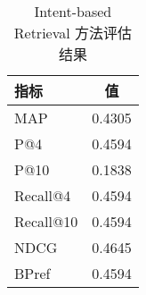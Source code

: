 \begin{table}[h]
\centering
\caption{Intent-based Retrieval 方法评估结果}
\begin{tabular}{|l|c|}
\hline
指标 & 值 \\
\hline
MAP & 0.4305 \\
P@4 & 0.4594 \\
P@10 & 0.1838 \\
Recall@4 & 0.4594 \\
Recall@10 & 0.4594 \\
NDCG & 0.4645 \\
BPref & 0.4594 \\
\hline
\end{tabular}
\end{table}
